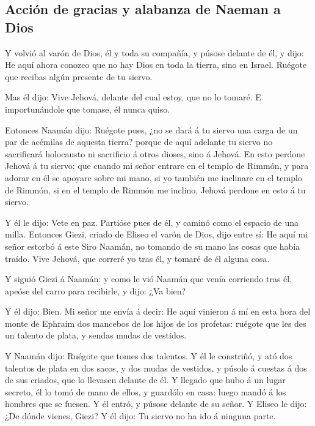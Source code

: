 \hypertarget{acciuxf3n-de-gracias-y-alabanza-de-naeman-a-dios}{%
\subsection{Acción de gracias y alabanza de Naeman a
Dios}\label{acciuxf3n-de-gracias-y-alabanza-de-naeman-a-dios}}

 Y volvió al varón de Dios, él y toda su compañía, y
púsose delante de él, y dijo: He aquí ahora conozco que no hay Dios en
toda la tierra, sino en Israel. Ruégote que recibas algún presente de tu
siervo.

 Mas él dijo: Vive Jehová, delante del cual estoy, que no
lo tomaré. E importunándole que tomase, él nunca quiso.

 Entonces Naamán dijo: Ruégote pues, ¿no se dará á tu
siervo una carga de un par de acémilas de aquesta tierra? porque de aquí
adelante tu siervo no sacrificará holocausto ni sacrificio á otros
dioses, sino á Jehová.  En esto perdone Jehová á tu
siervo: que cuando mi señor entrare en el templo de Rimmón, y para
adorar en él se apoyare sobre mi mano, si yo también me inclinare en el
templo de Rimmón, si en el templo de Rimmón me inclino, Jehová perdone
en esto á tu siervo.

 Y él le dijo: Vete en paz. Partióse pues de él, y caminó
como el espacio de una milla.  Entonces Giezi, criado de
Eliseo el varón de Dios, dijo entre sí: He aquí mi señor estorbó á este
Siro Naamán, no tomando de su mano las cosas que había traído. Vive
Jehová, que correré yo tras él, y tomaré de él alguna cosa.

 Y siguió Giezi á Naamán: y como le vió Naamán que venía
corriendo tras él, apeóse del carro para recibirle, y dijo: ¿Va bien?

 Y él dijo: Bien. Mi señor me envía á decir: He aquí
vinieron á mí en esta hora del monte de Ephraim dos mancebos de los
hijos de los profetas: ruégote que les des un talento de plata, y sendas
mudas de vestidos.

 Y Naamán dijo: Ruégote que tomes dos talentos. Y él le
constriñó, y ató dos talentos de plata en dos sacos, y dos mudas de
vestidos, y púsolo á cuestas á dos de sus criados, que lo llevasen
delante de él.  Y llegado que hubo á un lugar secreto, él
lo tomó de mano de ellos, y guardólo en casa: luego mandó á los hombres
que se fuesen.  Y él entró, y púsose delante de su señor.
Y Eliseo le dijo: ¿De dónde vienes, Giezi? Y él dijo: Tu siervo no ha
ido á ninguna parte.

